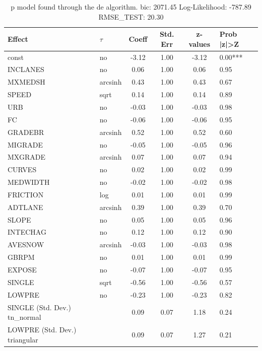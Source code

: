 \begin{table}
	\caption{p model found through the de algorithm. bic: 2071.45 Log-Likelihood: -787.89 RMSE_TEST: 20.30}
	\begin{center}
		\begin{tabular}{|l|l|c|c|c|l|}
			\hline
			Effect & $\tau$ & Coeff & Std. Err & z-values & Prob |z|>Z \\
			\hline
			const & no & -3.12 & 1.00 & -3.12 & 0.00*** \\
			\hline
			INCLANES & no & 0.06 & 1.00 & 0.06 & 0.95 \\
			\hline
			MXMEDSH & arcsinh & 0.43 & 1.00 & 0.43 & 0.67 \\
			\hline
			SPEED & sqrt & 0.14 & 1.00 & 0.14 & 0.89 \\
			\hline
			URB & no & -0.03 & 1.00 & -0.03 & 0.98 \\
			\hline
			FC & no & -0.06 & 1.00 & -0.06 & 0.95 \\
			\hline
			GRADEBR & arcsinh & 0.52 & 1.00 & 0.52 & 0.60 \\
			\hline
			MIGRADE & no & -0.05 & 1.00 & -0.05 & 0.96 \\
			\hline
			MXGRADE & arcsinh & 0.07 & 1.00 & 0.07 & 0.94 \\
			\hline
			CURVES & no & 0.02 & 1.00 & 0.02 & 0.99 \\
			\hline
			MEDWIDTH & no & -0.02 & 1.00 & -0.02 & 0.98 \\
			\hline
			FRICTION & log & 0.01 & 1.00 & 0.01 & 0.99 \\
			\hline
			ADTLANE & arcsinh & 0.39 & 1.00 & 0.39 & 0.70 \\
			\hline
			SLOPE & no & 0.05 & 1.00 & 0.05 & 0.96 \\
			\hline
			INTECHAG & no & 0.12 & 1.00 & 0.12 & 0.90 \\
			\hline
			AVESNOW & arcsinh & -0.03 & 1.00 & -0.03 & 0.98 \\
			\hline
			GBRPM & no & 0.01 & 1.00 & 0.01 & 0.99 \\
			\hline
			EXPOSE & no & -0.07 & 1.00 & -0.07 & 0.95 \\
			\hline
			SINGLE & sqrt & -0.56 & 1.00 & -0.56 & 0.57 \\
			\hline
			LOWPRE & no & -0.23 & 1.00 & -0.23 & 0.82 \\
			\hline
			SINGLE (Std. Dev.) tn_normal &  & 0.09 & 0.07 & 1.18 & 0.24 \\
			\hline
			LOWPRE (Std. Dev.) triangular &  & 0.09 & 0.07 & 1.27 & 0.21 \\
			\hline
		\end{tabular}
	\end{center}
\end{table}